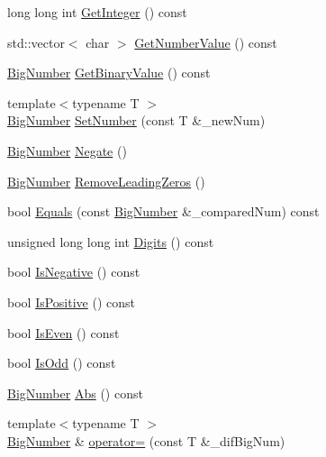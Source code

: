 \begin{DoxyCompactItemize}
long long int \mbox{\hyperlink{class_big_nums_1_1_big_number_a4fb18fef2725c13a977ef6545563e361}{Get\+Integer}} () const
\item 
std\+::vector$<$ char $>$ \mbox{\hyperlink{class_big_nums_1_1_big_number_af8f5505982e08fb73817cba94e70ff1c}{Get\+Number\+Value}} () const
\item 
\mbox{\hyperlink{class_big_nums_1_1_big_number}{Big\+Number}} \mbox{\hyperlink{class_big_nums_1_1_big_number_a02c53d5b7c27e3b80c5f8ee5982a8875}{Get\+Binary\+Value}} () const
\item 
{\footnotesize template$<$typename T $>$ }\\\mbox{\hyperlink{class_big_nums_1_1_big_number}{Big\+Number}} \mbox{\hyperlink{class_big_nums_1_1_big_number_a7e47aaceaeacdfa5685158daa230dbfd}{Set\+Number}} (const T \&\+\_\+new\+Num)
\item 
\mbox{\hyperlink{class_big_nums_1_1_big_number}{Big\+Number}} \mbox{\hyperlink{class_big_nums_1_1_big_number_a9f52fbb5f431c7d6a82e40f34e5b1f6e}{Negate}} ()
\item 
\mbox{\hyperlink{class_big_nums_1_1_big_number}{Big\+Number}} \mbox{\hyperlink{class_big_nums_1_1_big_number_a440be0c0feaf4be408ed8f7fa6b42926}{Remove\+Leading\+Zeros}} ()
\item 
bool \mbox{\hyperlink{class_big_nums_1_1_big_number_af459e1abf1ec5721b7288979e71cd672}{Equals}} (const \mbox{\hyperlink{class_big_nums_1_1_big_number}{Big\+Number}} \&\+\_\+compared\+Num) const
\item 
unsigned long long int \mbox{\hyperlink{class_big_nums_1_1_big_number_ae35841de4a2037e6edc02bcbf40600ba}{Digits}} () const
\item 
bool \mbox{\hyperlink{class_big_nums_1_1_big_number_af5203c02639f6dc409016bfb4710dafc}{Is\+Negative}} () const
\item 
bool \mbox{\hyperlink{class_big_nums_1_1_big_number_a8d1479eed46930fdcd374c85881c2864}{Is\+Positive}} () const
\item 
bool \mbox{\hyperlink{class_big_nums_1_1_big_number_abf9a23b42aa137baa8a040a6cf524cca}{Is\+Even}} () const
\item 
bool \mbox{\hyperlink{class_big_nums_1_1_big_number_afa4fe9880b4c307cd12ebbdbe94c28d2}{Is\+Odd}} () const
\item 
\mbox{\hyperlink{class_big_nums_1_1_big_number}{Big\+Number}} \mbox{\hyperlink{class_big_nums_1_1_big_number_ae4675cb61567802acb26e194d63ac454}{Abs}} () const
\item 
{\footnotesize template$<$typename T $>$ }\\\mbox{\hyperlink{class_big_nums_1_1_big_number}{Big\+Number}} \& \mbox{\hyperlink{class_big_nums_1_1_big_number_abd9a823365d0e1f44b27adb87ce629cc}{operator=}} (const T \&\+\_\+dif\+Big\+Num)

\end{DoxyCompactItemize}
